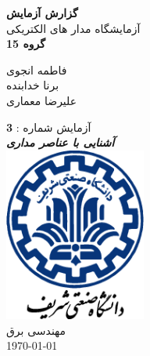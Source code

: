 \begin{titlepage}
	\begin{center}
		\vspace*{0.5cm}
		\Huge
		\textbf{گزارش آزمایش\\}
		\LARGE
		\vspace*{0.5cm}
		آزمایشگاه مدار های الکتریکی\\

		\vspace*{0.5cm}
		\textbf{گروه 15\\}
		\vspace*{0.3cm}
		\begin{center}
			فاطمه انجوی\\
			برنا خدابنده\\
			علیرضا معماری
		\end{center}
		\vfill
		\Large
		آزمایش شماره : \textbf{3}\\
		\textbf{\textit{آشنایی با عناصر مداری}}\\
		\vspace*{0.8cm}
		\includegraphics[width = 0.35\textwidth]{62.png}\\
		مهندسی برق\\
		\vspace*{0.3cm}
		\today
	\end{center}
\end{titlepage}